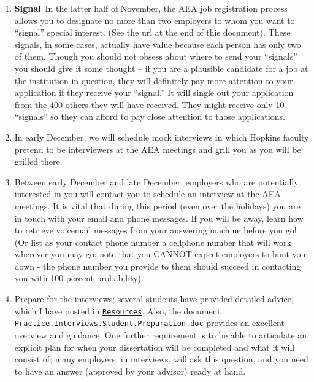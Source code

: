 \documentclass{\classes/econtex}
\begin{document}
\begin{enumerate}
\item \ifdvi\hypertarget{Signal}{{\bf Signal}~}\fi In the latter half of November, the AEA job registration process 
  allows you to designate no more than two employers to whom you want
  to ``signal'' special interest.  (See the url at the end of this
  document).  These signals, in some cases, actually have value because 
  each person has only two of them.  Though you should not obsess about 
  where to send your ``signals'' you should give it some thought -- if you
  are a plausible candidate for a job at the institution in question, they
  will definitely pay more attention to your application if they receive your 
  ``signal.''  It will single out your application from the 400 others they will have received.
  They might receive only 10 ``signals'' so they can afford to pay close attention
  to those applications.

  
  \hypertarget{Mock-Interviews}{}
\item In early December, we will schedule mock interviews in which
  Hopkins faculty pretend to be interviewers at the AEA meetings and
  grill you as you will be grilled there.
  
  \hypertarget{Be-Reachable}{}
\item Between early December and late December, employers who are
  potentially interested in you will contact you to schedule an
  interview at the AEA meetings.  It is vital that during this period
  (even over the holidays) you are in touch with your email and phone
  messages.  If you will be away, learn how to retrieve voicemail
  messages from your answering machine before you go!  (Or list as
  your contact phone number a cellphone number that will work wherever
  you may go; note that you CANNOT expect employers to hunt you down -
  the phone number you provide to them should succeed in contacting
  you with 100 percent probability).
  
  \hypertarget{Prep-For-Interviews}{}
\item Prepare for the interviews; several students have provided
  detailed advice, which I have posted in \href{\treeurl/Resources}{\texttt{Resources}}.  Also, the document
  \texttt{Practice.Interviews.Student.Preparation.doc} provides an
  excellent overview and guidance. One further requirement is to be
  able to articulate an explicit plan for when your dissertation will
  be completed and what it will consist of; many employers, in
  interviews, will ask this question, and you need to have an answer
  (approved by your advisor) ready at hand. \ifdvi\hypertarget{InterviewPrep}{}\fi
  

\end{enumerate}
\end{document}
